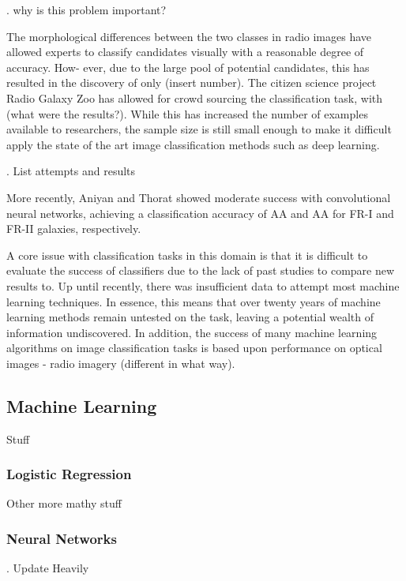 \documentclass[%
 aip,
 jmp,%
 amsmath,amssymb,
 reprint,%
]{revtex4-1}
\begin{document}
. why is this problem important?

The morphological differences between the two classes
in radio images have allowed experts to classify candidates visually with a reasonable degree of accuracy. How-
ever, due to the large pool of potential candidates, this
has resulted in the discovery of only (insert number). The
citizen science project Radio Galaxy Zoo has allowed for
crowd sourcing the classification task, with (what were
the results?). While this has increased the number of
examples available to researchers, the sample size is still
small enough to make it difficult apply the state of the
art image classification methods such as deep learning.

. List attempts and results

More recently, Aniyan and Thorat showed moderate
success with convolutional neural networks, achieving a
classification accuracy of AA and AA for FR-I and FR-II
galaxies, respectively.

A core issue with classification tasks in this domain is
that it is difficult to evaluate the success of classifiers due to the lack of past studies to compare new results to. Up until recently, there was insufficient data to attempt most machine learning techniques. In essence, this means that over twenty years of machine learning methods remain
untested on the task, leaving a potential wealth of information undiscovered. In addition, the success of many
machine learning algorithms on image classification tasks
is based upon performance on optical images - radio imagery (different in what way).

\subsection{\label{sec:level2}Machine Learning}

Stuff

\subsubsection{\label{sec:level3}Logistic Regression}

Other more mathy stuff

\subsubsection{\label{sec:level3}Neural Networks}

. Update Heavily 
\end{document}
